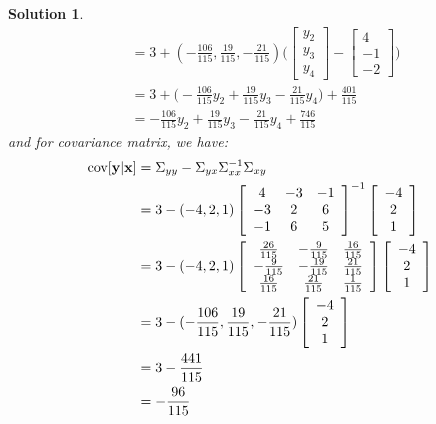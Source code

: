 \documentclass[11pt]{article}
\newtheorem{sol}{Solution}
\begin{document}
\begin{sol}
\begin{align*}
		&= 3 + (-\frac{106}{115}, \frac{19}{115}, -\frac{21}{115})\Big(\left[\begin{array}{c} y_2\\ y_3\\ y_4\end{array}\right] - \left[\begin{array}{c} 4\\ -1\\ -2\end{array}\right]\Big)\\
		&= 3 + \Big(-\frac{106}{115}y_2 + \frac{19}{115}y_3 - \frac{21}{115}y_4\Big) + \frac{401}{115}\\
		&=  -\frac{106}{115}y_2 + \frac{19}{115}y_3 - \frac{21}{115}y_4 + \frac{746}{115}
	\end{align*}
	and for covariance matrix, we have:
	\begin{align*}
		\text{cov}[{\bf y}|{\bf x}] &= \Sigma_{yy} - \Sigma_{yx}\Sigma_{xx}^{-1}\Sigma_{xy}\\
		&= 3 - (-4, 2, 1)\left[\begin{array}{ccc} 4&-3&-1\\ -3&2&6\\ -1&6&5\end{array}\right]^{-1}\left[\begin{array}{c} -4\\ 2\\ 1\end{array}\right]\\
		&= 3 - (-4, 2, 1)\left[\begin{array}{ccc} \frac{26}{115}& -\frac{9}{115}&\frac{16}{115}\\ -\frac{9}{115}&-\frac{19}{115} &\frac{21}{115}\\ \frac{16}{115}&\frac{21}{115} &\frac{1}{115}\end{array}\right]\left[\begin{array}{c} -4\\ 2\\ 1\end{array}\right]\\
	&= 3 - (-\frac{106}{115}, \frac{19}{115}, -\frac{21}{115})\left[\begin{array}{c} -4\\ 2\\1 \end{array}\right]\\
	&= 3 - \frac{441}{115}\\
	&= -\frac{96}{115}
	\end{align*}

\end{sol}
\end{document}
